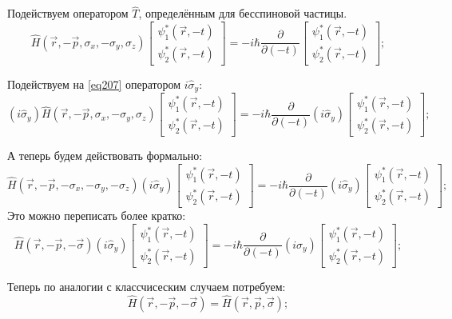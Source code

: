 \documentclass[a4paper, 14pt, russian]{article}
\newcommand{\be}{\begin{equation}}
\newcommand{\ee}{\end{equation}}
\newcommand{\pa}{\partial}
\begin{document}
	Подействуем оператором $\hat T$, определённым для бесспиновой частицы. 
	\be
		\label{eq207}
		\hat{H}(\vec r, -\vec p, \sigma_x, -\sigma_y, \sigma_z)
		\begin{bmatrix} \psi_1^{*}(\vec r, -t)\\ \psi_2^{*}(\vec r, -t)\end{bmatrix}
		 = -i \hbar \frac{\pa}{\pa(-t)} 
		\begin{bmatrix} \psi_1^{*}(\vec r, -t)\\ \psi_2^{*}(\vec r, -t)\end{bmatrix};
	\ee

	Подействуем на \ref{eq207} оператором $i\hat{\sigma}_y$:
	\be
		(i\hat{\sigma}_y)\hat{H}(\vec r, -\vec p, \sigma_x, -\sigma_y, \sigma_z)
		\begin{bmatrix} \psi_1^{*}(\vec r, -t)\\ \psi_2^{*}(\vec r, -t)\end{bmatrix}
 		= -i \hbar \frac{\pa}{\pa(-t)} (i\hat{\sigma}_y)
		\begin{bmatrix} \psi_1^{*}(\vec r, -t)\\ \psi_2^{*}(\vec r, -t)\end{bmatrix};
	\ee

	А теперь будем действовать формально:
	\be
		\hat{H}(\vec r, -\vec p, -\sigma_x, -\sigma_y, -\sigma_z) (i\hat{\sigma}_y)
		\begin{bmatrix} \psi_1^{*}(\vec r, -t)\\ \psi_2^{*}(\vec r, -t)\end{bmatrix}
 		= -i \hbar \frac{\pa}{\pa(-t)} (i\hat{\sigma}_y)
		\begin{bmatrix} \psi_1^{*}(\vec r, -t)\\ \psi_2^{*}(\vec r, -t)\end{bmatrix};
	\ee
	Это можно переписать более кратко:
	\be
		\label{eq208}
		\hat{H}(\vec r, -\vec p, -\vec{\sigma}) (i\hat{\sigma}_y)
		\begin{bmatrix} \psi_1^{*}(\vec r, -t)\\ \psi_2^{*}(\vec r, -t)\end{bmatrix}
 		= -i \hbar \frac{\pa}{\pa(-t)} (i\hat{\sigma}_y)
		\begin{bmatrix} \psi_1^{*}(\vec r, -t)\\ \psi_2^{*}(\vec r, -t)\end{bmatrix};
	\ee

	Теперь по аналогии с классчисеским случаем потребуем:
	\be
		\label{eq209}
		\hat{H}(\vec r, -\vec p, -\vec \sigma) = \hat{H}(\vec r, \vec p, \vec \sigma);
	\ee
\end{document}
